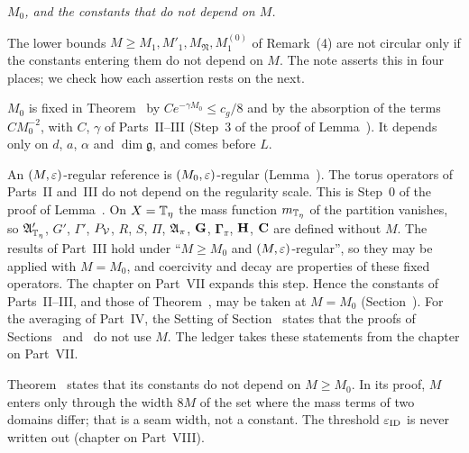 \begin{detail}\label{det:ledger-M0}
\emph{$M_0$, and the constants that do not depend on $M$.}

The lower bounds $M\ge M_1,M'_1,M_{\mathfrak N},M^{(0)}_1$ of Remark~(4) are not circular only if the constants entering them do not depend on $M$. The note asserts this in four places; we check how each assertion rests on the next.

\begin{step}[$M_0$]
$M_0$ is fixed in Theorem~ by $Ce^{-\gamma M_0}\le c_g/8$ and by the absorption of the terms $CM_0^{-2}$, with $C$, $\gamma$ of Parts~II--III (Step~3 of the proof of Lemma~). It depends only on $d$, $a$, $\alpha$ and $\dim\mathfrak g$, and comes before $L$.
\end{step}

\begin{step}[Parts~II--V]\label{det:ledger-M0-parts}
An $(M,\varepsilon)$-regular reference is $(M_0,\varepsilon)$-regular (Lemma~). The torus operators of Parts~II and~III do not depend on the regularity scale. This is Step~0 of the proof of Lemma~. On $X=\mathbb T_\eta$ the mass function $m_{\mathbb T_\eta}$ of the partition vanishes, so $\mathfrak A'_{\mathbb T_\eta}$, $G'$, $\Gamma'$, $P_\mathcal V$, $R$, $S$, $\Pi$, $\mathfrak A_\pi$, $\mathbf G$, $\boldsymbol\Gamma_\pi$, $\mathbf H$, $\mathbf C$ are defined without $M$. The results of Part~III hold under ``$M\ge M_0$ and $(M,\varepsilon)$-regular'', so they may be applied with $M=M_0$, and coercivity and decay are properties of these fixed operators. The chapter on Part~VII expands this step. Hence the constants of Parts~II--III, and those of Theorem~, may be taken at $M=M_0$ (Section~). For the averaging of Part~IV, the Setting of Section~ states that the proofs of Sections~ and~ do not use $M$. The ledger takes these statements from the chapter on Part~VII.

Theorem~ states that its constants do not depend on $M\ge M_0$. In its proof, $M$ enters only through the width $8M$ of the set where the mass terms of two domains differ; that is a seam width, not a constant. The threshold $\varepsilon_{\rm ID}$ is never written out (chapter on Part~VIII).
\end{step}


\end{detail}
